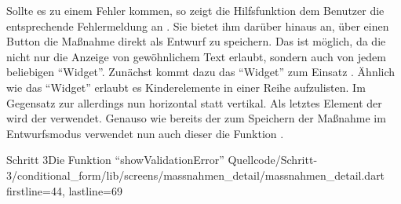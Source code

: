 Sollte es zu einem Fehler kommen, so zeigt die Hilfsfunktion  dem Benutzer die entsprechende Fehlermeldung an \Lst{\ref{lst:Schritt3showValidationError}}.
Sie bietet ihm darüber hinaus an, über einen Button die Maßnahme direkt als Entwurf zu speichern.
Das ist möglich, da die   nicht nur die Anzeige von gewöhnlichem Text erlaubt, sondern auch von jedem beliebigen \enquote{Widget}.
Zunächst kommt dazu das \enquote{Widget}  zum Einsatz .
Ähnlich wie das \enquote{Widget}  erlaubt es Kinderelemente in einer Reihe aufzulisten.
Im Gegensatz zur  allerdings nun horizontal statt vertikal.
Als letztes Element der  wird der   verwendet.
Genauso wie bereits der  zum Speichern der Maßnahme im Entwurfsmodus verwendet nun auch dieser  die Funktion  .

\begin{alexlisting}{Schritt 3}{Die Funktion \enquote{showValidationError}}
    {Quellcode/Schritt-3/conditional_form/lib/screens/massnahmen_detail/massnahmen_detail.dart}
    {firstline=44, lastline=69}
    \label{lst:Schritt3showValidationError}
\end{alexlisting}

